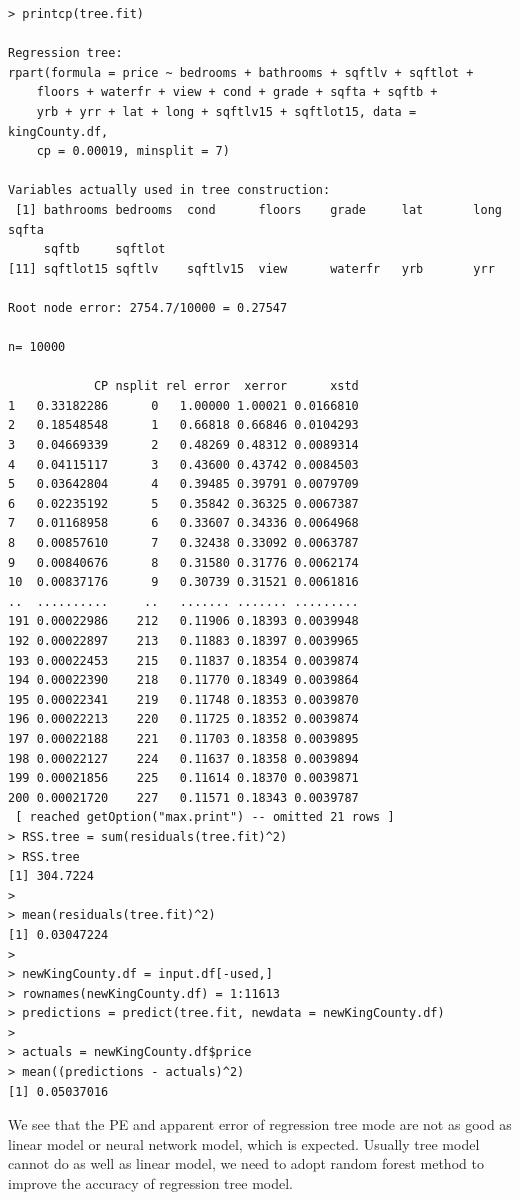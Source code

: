 \documentclass{article}%
\begin{document}
\begin{verbatim}
> printcp(tree.fit)

Regression tree:
rpart(formula = price ~ bedrooms + bathrooms + sqftlv + sqftlot +
    floors + waterfr + view + cond + grade + sqfta + sqftb +
    yrb + yrr + lat + long + sqftlv15 + sqftlot15, data = kingCounty.df,
    cp = 0.00019, minsplit = 7)

Variables actually used in tree construction:
 [1] bathrooms bedrooms  cond      floors    grade     lat       long      sqfta 
     sqftb     sqftlot
[11] sqftlot15 sqftlv    sqftlv15  view      waterfr   yrb       yrr

Root node error: 2754.7/10000 = 0.27547

n= 10000

            CP nsplit rel error  xerror      xstd
1   0.33182286      0   1.00000 1.00021 0.0166810
2   0.18548548      1   0.66818 0.66846 0.0104293
3   0.04669339      2   0.48269 0.48312 0.0089314
4   0.04115117      3   0.43600 0.43742 0.0084503
5   0.03642804      4   0.39485 0.39791 0.0079709
6   0.02235192      5   0.35842 0.36325 0.0067387
7   0.01168958      6   0.33607 0.34336 0.0064968
8   0.00857610      7   0.32438 0.33092 0.0063787
9   0.00840676      8   0.31580 0.31776 0.0062174
10  0.00837176      9   0.30739 0.31521 0.0061816
..  ..........     ..   ....... ....... .........
191 0.00022986    212   0.11906 0.18393 0.0039948
192 0.00022897    213   0.11883 0.18397 0.0039965
193 0.00022453    215   0.11837 0.18354 0.0039874
194 0.00022390    218   0.11770 0.18349 0.0039864
195 0.00022341    219   0.11748 0.18353 0.0039870
196 0.00022213    220   0.11725 0.18352 0.0039874
197 0.00022188    221   0.11703 0.18358 0.0039895
198 0.00022127    224   0.11637 0.18358 0.0039894
199 0.00021856    225   0.11614 0.18370 0.0039871
200 0.00021720    227   0.11571 0.18343 0.0039787
 [ reached getOption("max.print") -- omitted 21 rows ]
> RSS.tree = sum(residuals(tree.fit)^2)
> RSS.tree
[1] 304.7224
>
> mean(residuals(tree.fit)^2)
[1] 0.03047224
>
> newKingCounty.df = input.df[-used,]
> rownames(newKingCounty.df) = 1:11613
> predictions = predict(tree.fit, newdata = newKingCounty.df)
>
> actuals = newKingCounty.df$price
> mean((predictions - actuals)^2)
[1] 0.05037016
\end{verbatim}

\indent We see that the PE and apparent error of regression tree mode are not as good as linear model or neural network model, which is expected. Usually tree model cannot do as well as linear model, we need to adopt random forest method to improve the accuracy of regression tree model.
\end{document}
